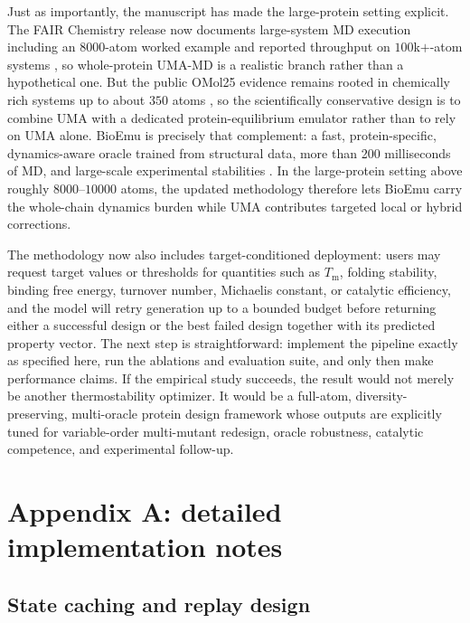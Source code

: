 \documentclass[11pt]{article}
\newcommand{\Tm}{\ensuremath{T_{\mathrm m}}}
\begin{document}
	Just as importantly, the manuscript has made the large-protein setting explicit. The FAIR Chemistry release now documents large-system MD execution including an $8000$-atom worked example and reported throughput on $100$k$+$-atom systems \citep{fairchem2025github}, so whole-protein UMA-MD is a realistic branch rather than a hypothetical one. But the public OMol25 evidence remains rooted in chemically rich systems up to about $350$ atoms \citep{levine2025omol25}, so the scientifically conservative design is to combine UMA with a dedicated protein-equilibrium emulator rather than to rely on UMA alone. BioEmu is precisely that complement: a fast, protein-specific, dynamics-aware oracle trained from structural data, more than 200 milliseconds of MD, and large-scale experimental stabilities \citep{lewis2024bioemu}. In the large-protein setting above roughly $8000$--$10000$ atoms, the updated methodology therefore lets BioEmu carry the whole-chain dynamics burden while UMA contributes targeted local or hybrid corrections.
	
	The methodology now also includes target-conditioned deployment: users may request target values or thresholds for quantities such as $\Tm$, folding stability, binding free energy, turnover number, Michaelis constant, or catalytic efficiency, and the model will retry generation up to a bounded budget before returning either a successful design or the best failed design together with its predicted property vector. The next step is straightforward: implement the pipeline exactly as specified here, run the ablations and evaluation suite, and only then make performance claims. If the empirical study succeeds, the result would not merely be another thermostability optimizer. It would be a full-atom, diversity-preserving, multi-oracle protein design framework whose outputs are explicitly tuned for variable-order multi-mutant redesign, oracle robustness, catalytic competence, and experimental follow-up.
	
	\appendix
	
	\section{Appendix A: detailed implementation notes}
	
	\subsection{State caching and replay design}
	
\end{document}
